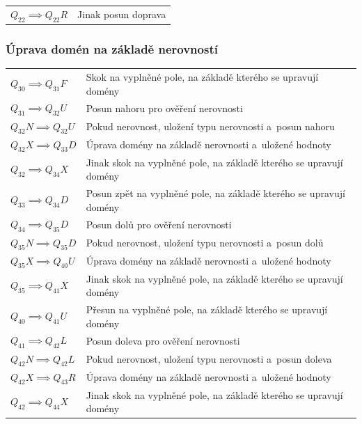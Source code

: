 \noindent
\begin{tabular}{@{}p{4cm} p{10.5cm}@{}}
    \(Q_{22} \implies Q_{22}R\) & Jinak posun doprava \\
\end{tabular}

\subsubsection*{Úprava domén na základě nerovností}
\begin{tabular}{@{}p{4cm} p{10.5cm}@{}}
    \(Q_{30} \implies Q_{31}F\) & Skok na vyplněné pole, na základě kterého
        se upravují domény \\
    \(Q_{31} \implies Q_{32}U\) & Posun nahoru pro ověření nerovnosti \\
    \(Q_{32}N \implies Q_{32}U\) & Pokud nerovnost, uložení typu nerovnosti
        a~posun nahoru \\
    \(Q_{32}X \implies Q_{33}D\) & Úprava domény na základě nerovnosti
        a~uložené hodnoty \\
    \(Q_{32} \implies Q_{34}X\) & Jinak skok na vyplněné pole, na základě
        kterého se upravují domény \\

    \(Q_{33} \implies Q_{34}D\) & Posun zpět na vyplněné pole, na základě
        kterého se upravují domény \\
    \(Q_{34} \implies Q_{35}D\) & Posun dolů pro ověření nerovnosti \\
    \(Q_{35}N \implies Q_{35}D\) & Pokud nerovnost, uložení typu nerovnosti
        a~posun dolů \\
    \(Q_{35}X \implies Q_{40}U\) & Úprava domény na základě nerovnosti
        a~uložené hodnoty \\
    \(Q_{35} \implies Q_{41}X\) & Jinak skok na vyplněné pole, na základě
        kterého se upravují domény \\

    \(Q_{40} \implies Q_{41}U\) & Přesun na vyplněné pole, na základě kterého
        se upravují domény \\
    \(Q_{41} \implies Q_{42}L\) & Posun doleva pro ověření nerovnosti \\
    \(Q_{42}N \implies Q_{42}L\) & Pokud nerovnost, uložení typu nerovnosti
        a~posun doleva \\
    \(Q_{42}X \implies Q_{43}R\) & Úprava domény na základě nerovnosti
        a~uložené hodnoty \\
    \(Q_{42} \implies Q_{44}X\) & Jinak skok na vyplněné pole, na základě
        kterého se upravují domény \\


\end{tabular}
